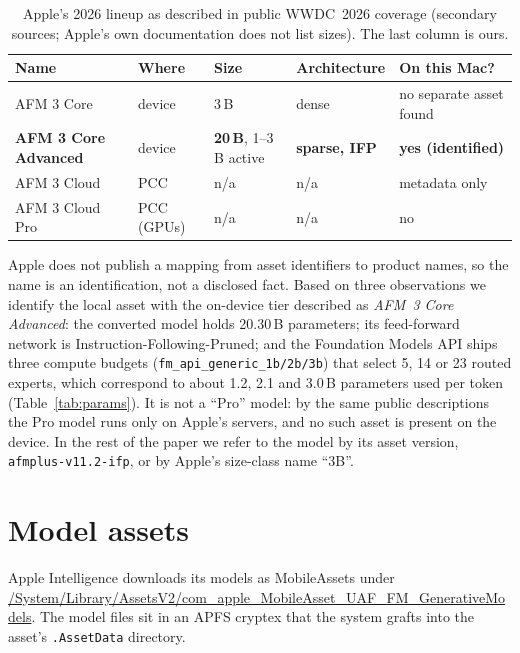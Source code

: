 \documentclass[11pt,reqno]{amsart}
\newcommand{\code}[1]{\texttt{#1}}
\theoremstyle{definition}
\begin{document}
\begin{table}[H]
\centering\small
\begin{tabular}{@{}lllll@{}}
\toprule
Name & Where & Size & Architecture & On this Mac? \\
\midrule
AFM 3 Core & device & 3\,B & dense & no separate asset found \\
\textbf{AFM 3 Core Advanced} & device & \textbf{20\,B}, 1--3\,B active & \textbf{sparse, IFP} & \textbf{yes (identified)} \\
AFM 3 Cloud & PCC & n/a & n/a & metadata only \\
AFM 3 Cloud Pro & PCC (GPUs) & n/a & n/a & no \\
\bottomrule
\end{tabular}
\caption{Apple's 2026 lineup as described in public WWDC~2026 coverage (secondary sources; Apple's own documentation does not list sizes). The last column is ours.}\label{tab:lineup}
\end{table}

\noindent Apple does not publish a mapping from asset identifiers to product names, so the name is an identification, not a disclosed fact. Based on three observations we identify the local asset with the on-device tier described as \emph{AFM~3 Core Advanced}: the converted model holds 20.30\,B parameters; its feed-forward network is Instruction-Following-Pruned; and the Foundation Models API ships three compute budgets (\code{fm\_api\_generic\_1b/2b/3b}) that select 5, 14 or 23 routed experts, which correspond to about 1.2, 2.1 and 3.0\,B parameters used per token (Table~\ref{tab:params}). It is not a ``Pro'' model: by the same public descriptions the Pro model runs only on Apple's servers, and no such asset is present on the device. In the rest of the paper we refer to the model by its asset version, \code{afmplus-v11.2-ifp}, or by Apple's size-class name ``3B''.

\section{Model assets}\label{sec:assets}

Apple Intelligence downloads its models as MobileAssets under \url{/System/Library/AssetsV2/com_apple_MobileAsset_UAF_FM_GenerativeModels}. The model files sit in an APFS cryptex that the system grafts into the asset's \code{.AssetData} directory.
\end{document}
